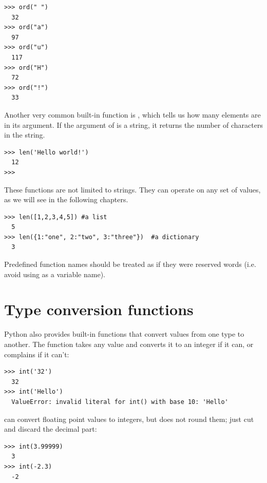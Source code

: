 \begin{Verbatim}[frame=single]
>>> ord(" ")
  32
>>> ord("a")
  97
>>> ord("u")
  117
>>> ord("H")
  72
>>> ord("!")
  33
\end{Verbatim}

Another very common built-in function is , which tells us how many elements are in its argument. If the argument of  is a string, it returns the number of characters in the string.

\begin{Verbatim}[frame=single]
>>> len('Hello world!')
  12
>>>
\end{Verbatim}

These functions are not limited to strings. They can operate on any set of values, as we will see in the following chapters.

\begin{Verbatim}[frame=single]
>>> len([1,2,3,4,5]) #a list
  5
>>> len({1:"one", 2:"two", 3:"three"})  #a dictionary
  3
\end{Verbatim}

Predefined function names should be treated as if they were reserved words (i.e. avoid using  as a variable name).

\hypertarget{funciones-de-conversiuxf3n-de-tipos}{%
\section{Type conversion functions}\label{funciones-de-conversiuxf3n-de-tipos}}

 

Python also provides built-in functions that convert values from one type to another. The  function takes any value and converts it to an integer if it can, or complains if it can't:

 

\begin{Verbatim}[frame=single]
>>> int('32')
  32
>>> int('Hello')
  ValueError: invalid literal for int() with base 10: 'Hello'
\end{Verbatim}

 can convert floating point values to integers, but does not round them; just cut and discard the decimal part:

\begin{Verbatim}[frame=single]
>>> int(3.99999)
  3
>>> int(-2.3)
  -2
\end{Verbatim}

